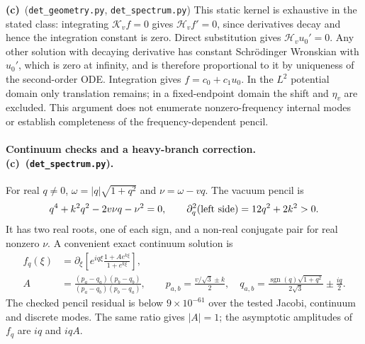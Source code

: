 \documentclass[11pt,a4paper]{article}
\newcommand{\Lc}{\textbf{(c)}}
\newcommand{\G}{\texttt{det\_geometry.py}}
\newcommand{\Scheck}{\texttt{det\_spectrum.py}}
\begin{document}
\Lc\ (\G, \Scheck) This static kernel is exhaustive in the stated class:
integrating $\mathcal K_vf=0$ gives $\mathcal H_vf'=0$, since derivatives
decay and hence the integration constant is zero. Direct substitution gives
$\mathcal H_vu_0'=0$. Any other solution with decaying derivative has constant
Schr\"odinger Wronskian with $u_0'$, which is zero at infinity, and is therefore
proportional to it by uniqueness of the second-order ODE. Integration gives
$f=c_0+c_1u_0$. In the $L^2$ potential domain only translation remains;
in a fixed-endpoint domain the shift and $\eta_v$ are excluded.
This argument does not enumerate nonzero-frequency internal modes or establish
completeness of the frequency-dependent pencil.

\paragraph{Continuum checks and a heavy-branch correction. \Lc\ (\Scheck).}
For real $q\ne0$, $\omega=|q|\sqrt{1+q^2}$ and $\nu=\omega-vq$.
The vacuum pencil is
\begin{equation}
 q^4+k^2q^2-2v\nu q-\nu^2=0,\qquad
 \partial_q^2(\hbox{left side})=12q^2+2k^2>0.
\end{equation}
It has two real roots, one of each sign, and a non-real conjugate pair for
real nonzero $\nu$. A convenient exact continuum solution is
\begin{align}
 f_q(\xi)&=\partial_\xi\left[
 e^{iq\xi}\frac{1+A e^{k\xi}}{1+e^{k\xi}}\right],\\
 A&=\frac{(p_a-q_a)(p_b-q_b)}{(p_a-q_b)(p_b-q_a)},\qquad
 p_{a,b}=\frac{v/\sqrt3\pm k}{2},\quad
 q_{a,b}=\frac{\operatorname{sgn}(q)\sqrt{1+q^2}}{2\sqrt3}\pm\frac{iq}{2}.
\end{align}
The checked pencil residual is below $9\times10^{-61}$ over the tested
Jacobi, continuum and discrete modes. The same ratio gives $|A|=1$;
the asymptotic amplitudes of $f_q$ are $iq$ and $iqA$.
\end{document}

